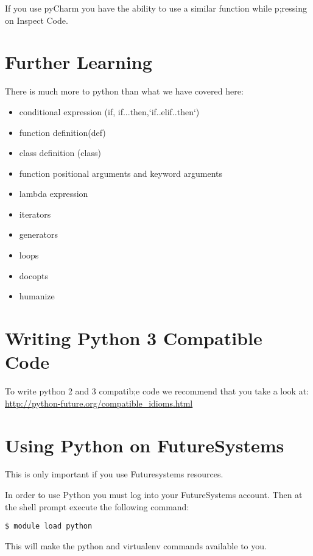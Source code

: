 If you use pyCharm you have the ability to use a similar function while
p;ressing on Inspect Code.

\section{Further Learning}\label{further-learning}

There is much more to python than what we have covered here:

\begin{itemize}
\tightlist
\item
  conditional expression (if, if...then,`if..elif..then`)
\item
  function definition(def)
\item
  class definition (class)
\item
  function positional arguments and keyword arguments
\item
  lambda expression
\item
  iterators
\item
  generators
\item
  loops
\item
  docopts
\item
  humanize
\end{itemize}

\section{Writing Python 3 Compatible
Code}\label{writing-python-3-compatible-code}

To write python 2 and 3 compatib;e code we recommend that you take a
look at: \url{http://python-future.org/compatible_idioms.html}

\section{Using Python on
FutureSystems}\label{using-python-on-futuresystems}

This is only important if you use Futuresystems resources.

In order to use Python you must log into your FutureSystems account.
Then at the shell prompt execute the following command:

\begin{verbatim}
$ module load python
\end{verbatim}

This will make the python and virtualenv commands available to you.

